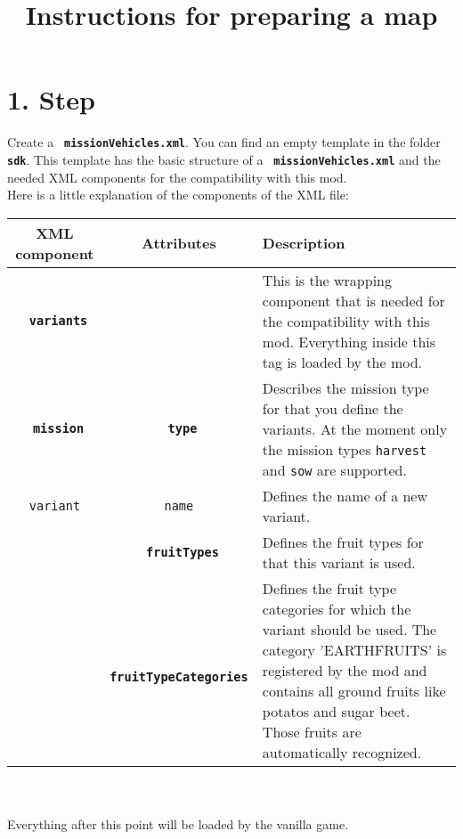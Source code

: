 \documentclass[a4paper]{scrartcl}
\title{Instructions for preparing a map}
\date{}
\newcommand{\XML}[1]{\texttt{\textbf{\color{pblue} #1}}}
\newcommand{\Attr}[1]{\texttt{\textbf{\color{pgreen} #1}}}
\newcommand{\Datei}[1]{\texttt{\textbf{\color{datei} #1}}}
\begin{document}
	\maketitle

	\section*{1. Step}
	Create a \Datei{missionVehicles.xml}. You can find an empty template in the folder \Datei{sdk}. This template has the basic structure of a \Datei{missionVehicles.xml} and the needed XML components for the compatibility with this mod.\\
	Here is a little explanation of the components of the XML file:\\
	\begin{tabular}{c|c|p{7cm}}
		\textbf{XML component} & \textbf{Attributes} & \textbf{Description}\\
		\hline
		\XML{variants} & & This is the wrapping component that is needed for the compatibility with this mod. Everything inside this tag is loaded by the mod.\\
		\hline
		\XML{mission} & \Attr{type} & Describes the mission type for that you define the variants. At the moment only the mission types \texttt{harvest} and \texttt{sow} are supported.\\
		\hline
		\texttt{variant} & \texttt{name} & Defines the name of a new variant.\\
		\hdashline
		& \Attr{fruitTypes} & Defines the fruit types for that this variant is used.\\
		\hdashline
		& \Attr{fruitTypeCategories} & Defines the fruit type categories for which the variant should be used.
		The category 'EARTHFRUITS' is registered by the mod and contains all ground fruits like potatos and sugar beet. Those fruits are automatically recognized.
	\end{tabular}\\
	\hspace{0.2cm}\\
	Everything after this point will be loaded by the vanilla game.\\
\end{document}
